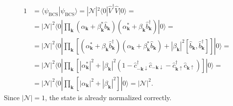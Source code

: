 \documentclass[english, parskip=full]{scrartcl}
\renewcommand{\braket}{}
\newcommand{\kla}{}
\newcommand{\klam}{}
\newcommand{\tecxt}{}
\begin{document}
\begin{align}
1 &= \braket\langle \psi_\tecxt\text{BCS} | \psi_\tecxt\text{BCS} \rangle = |\mathcal{N}|^2 \braket\langle 0 | \hat{V}^\dagger \hat{V} | 0 \rangle = \\
&= |\mathcal{N}|^2 \braket\langle 0 | \prod_\textbf{k} \kla\left( \alpha_\textbf{k} + \beta_\textbf{k}^\ast \hat{b}_\textbf{k} \right) \kla\left( \alpha_\textbf{k}^\ast + \beta_\textbf{k} \hat{b}_\textbf{k}^\dagger \right) | 0 \rangle = \\
&= |\mathcal{N}|^2 \braket\langle 0 | \prod_\textbf{k} \klam\left[ \kla\left( \alpha_\textbf{k}^\ast + \beta_\textbf{k} \hat{b}_\textbf{k}^\dagger \right) \kla\left( \alpha_\textbf{k} + \beta_\textbf{k}^\ast \hat{b}_\textbf{k} \right) + |\beta_\textbf{k}|^2 \klam\left[ \hat{b}_\textbf{k}, \hat{b}_\textbf{k}^\dagger \right] \right] | 0 \rangle = \\
&= |\mathcal{N}|^2 \braket\langle 0 | \prod_\textbf{k} \klam\left[ |\alpha_\textbf{k}^\ast|^2 + |\beta_\textbf{k}|^2 \kla\left( 1 - \hat{c}_{-\mathbf{k}\downarrow}^\dagger \hat{c}_{-\mathbf{k}\downarrow} - \hat{c}_{\mathbf{k}\uparrow}^\dagger \hat{c}_{\mathbf{k}\uparrow} \right) \right] | 0 \rangle = \\
&= |\mathcal{N}|^2 \braket\langle 0 | \prod_\textbf{k} \klam\left[ |\alpha_\textbf{k}|^2 + |\beta_\textbf{k}|^2 \right] | 0 \rangle = |\mathcal{N}|^2.
\end{align}
Since $|\mathcal{N}| = 1$, the state is already normalized correctly.
\end{document}

